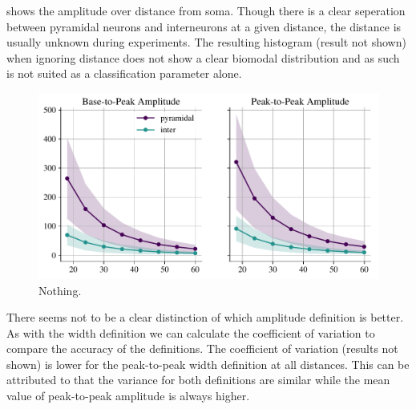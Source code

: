 \documentclass[altfont, fleqn]{uiophd}
\renewcommand{\Cref}[1]{{\color{viridis_03}\myCref{#1}}}
\begin{document}
\Cref{fig:4_amp_distance} shows the amplitude over distance from soma. 
Though there is a clear seperation between pyramidal neurons and interneurons
at a given distance, the distance is usually unknown during experiments. 
The resulting histogram (result not shown) when ignoring distance does not show a clear
biomodal distribution and as such is not suited as a
classification parameter alone. 

\begin{figure}[h]
    \begin{center}
        \includegraphics[width=\textwidth]{images/sec_4/int_pyr_amps_dist.pdf}
        \caption{
            Nothing.
        }
        \label{fig:4_amp_distance}
    \end{center}
\end{figure}

There seems not to be a clear distinction of which amplitude definition is better. 
As with the width definition we can calculate the coefficient of variation 
to compare the accuracy of the definitions. 
The coefficient of variation (results not shown) 
is lower for the peak-to-peak width definition at all distances.  
This can be attributed to that the variance for both definitions are similar 
while the mean value of peak-to-peak amplitude is always higher. 

\newpage
\end{document}
